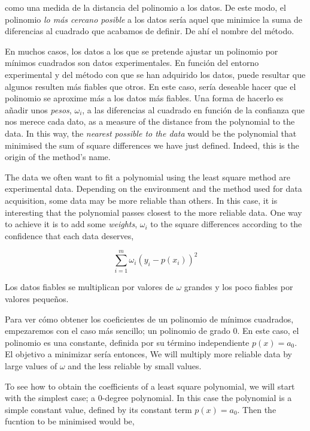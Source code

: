 \begin{paracol}{2}
\noindent como una medida de la distancia del polinomio a los datos.  De este modo,  el polinomio \emph{lo más cercano posible}  a los datos sería aquel que minimice la suma de diferencias al cuadrado que acabamos de definir. De ahí el nombre del método.

En muchos casos, los datos a los que se pretende ajustar un polinomio por mínimos cuadrados son datos experimentales. En función del entorno experimental y del método con que se han adquirido los datos, puede resultar que algunos resulten más fiables que otros. En este caso, sería deseable hacer que el polinomio se aproxime más a los datos más fiables. Una forma de hacerlo es añadir unos \emph{pesos}, $\omega_i$, a las diferencias al  cuadrado en función de la confianza que nos merece cada dato,
\switchcolumn
\noindent as a measure of the distance from the polynomial to the data. In this way, the \emph{nearest possible to the data} would be the polynomial that minimised the sum of square differences we have just defined. Indeed, this is the origin of the method's name.

The data we often want to fit a polynomial using the least square method are experimental data. Depending on the environment and the method used for data acquisition, some data may be more reliable than others. In this case, it is interesting that the polynomial passes closest to the more reliable data. One way to achieve it is to add some \emph{weights}, $\omega_i$ to the square differences according to the confidence that each data deserves,    
\end{paracol}
\begin{equation*}
\sum_{i=1}^m \omega_i \left(y_i-p(x_i)\right)^2
\end{equation*}
\begin{paracol}{2}
Los datos fiables se multiplican por valores de $\omega$ grandes y los poco fiables por valores pequeños.

Para ver cómo obtener los coeficientes de un polinomio de mínimos cuadrados, empezaremos con el caso más sencillo; un polinomio de grado $0$. En este caso, el polinomio es una constante, definida por su término independiente $p(x)=a_0$. El objetivo a minimizar sería entonces,
\switchcolumn
We will multiply more reliable data by large values of $\omega$ and the less reliable by small values.

To see how to obtain the coefficients of a least square polynomial, we will start with the simplest case; a 0-degree polynomial. In this case the polynomial is a simple constant value, defined by its constant term $p(x) = a_0$. Then the fucntion to be minimised would be,
\end{paracol}
